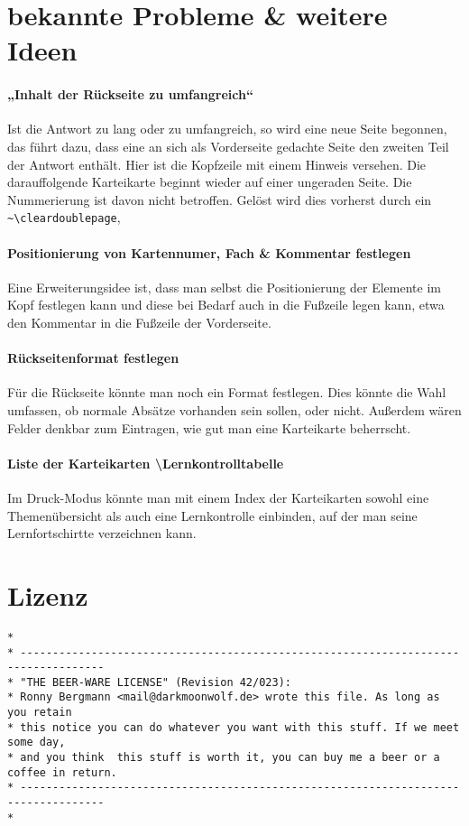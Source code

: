 \documentclass[a4paper]{article}
\begin{document}
\section{bekannte Probleme \& weitere Ideen}
\paragraph{„Inhalt der Rückseite zu umfangreich“} %
Ist die Antwort zu lang oder zu umfangreich, so wird eine neue Seite begonnen, das führt dazu, dass eine an sich als Vorderseite gedachte Seite den zweiten Teil der Antwort enthält. Hier ist die Kopfzeile mit einem Hinweis versehen. Die darauffolgende Karteikarte beginnt wieder auf einer ungeraden Seite. Die Nummerierung ist davon nicht betroffen. Gelöst wird dies vorherst durch ein \lstinline!~\cleardoublepage!, 

\paragraph{Positionierung von Kartennumer, Fach \& Kommentar festlegen}
Eine Erweiterungsidee ist, dass man selbst die Positionierung der Elemente im Kopf festlegen kann und diese bei Bedarf auch in die Fußzeile legen kann, etwa den Kommentar in die Fußzeile der Vorderseite.

\paragraph{Rückseitenformat festlegen} 
Für die Rückseite könnte man noch ein Format festlegen. Dies könnte die Wahl umfassen, ob normale Absätze vorhanden sein sollen, oder nicht. Außerdem wären Felder denkbar zum Eintragen, wie gut man eine Karteikarte beherrscht.

\paragraph{Liste der Karteikarten \textbackslash Lernkontrolltabelle} 
Im Druck-Modus könnte man mit einem Index der Karteikarten sowohl eine Themenübersicht als auch eine Lernkontrolle einbinden, auf der man seine Lernfortschirtte verzeichnen kann.
\newpage
\section{Lizenz}
\begin{lstlisting}[basicstyle=\footnotesize\sffamily, numbers=none]
*
* -----------------------------------------------------------------------------------
* "THE BEER-WARE LICENSE" (Revision 42/023):
* Ronny Bergmann <mail@darkmoonwolf.de> wrote this file. As long as you retain 
* this notice you can do whatever you want with this stuff. If we meet some day,
* and you think  this stuff is worth it, you can buy me a beer or a coffee in return. 
* -----------------------------------------------------------------------------------
*
\end{lstlisting}
\end{document}

